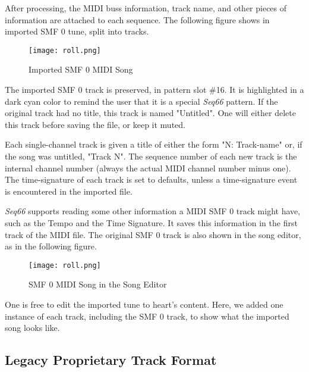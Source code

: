    After processing, the MIDI buss information, track name, and other pieces of
   information are attached to each sequence.  The following figure shows in
   imported SMF 0 tune, split into tracks.

\begin{figure}[H]
   \centering 
   \texttt{[image: roll.png]}
   \caption{Imported SMF 0 MIDI Song}
   \label{fig:imported_smf_0_song}
\end{figure}

   The imported SMF 0 track is preserved, in
   pattern slot \#16.  It is highlighted in a dark cyan color to remind the
   user that it is a special \textsl{Seq66} pattern.
   If the original track had no
   title, this track is named "Untitled".
   One will either delete
   this track before saving the file, or keep it muted.

   Each single-channel track is given a title of either the form
   "N: Track-name" or, if the song was untitled, "Track N".
   The sequence number of each new track is the internal channel number
   (always the actual MIDI channel number minus one).
   The time-signature of each track is set to defaults, unless a
   time-signature event is encountered in the imported file.

   \textsl{Seq66} supports reading some other
   information a MIDI SMF 0 track might have, such as the Tempo and the
   Time Signature.  It saves this information in the first track
   of the MIDI file.
   The original SMF 0 track is also shown in the song editor, as in the
   following figure.

\begin{figure}[H]
   \centering 
   \texttt{[image: roll.png]}
   \caption{SMF 0 MIDI Song in the Song Editor}
   \label{fig:imported_smf_0_song_editor}
\end{figure}

   One is free to edit the imported tune to heart's content.
   Here, we added one instance of each track, including the SMF 0 track,
   to show what the imported song looks like.

\subsection{Legacy Proprietary Track Format}
\label{subsec:legacy_midi_format}

